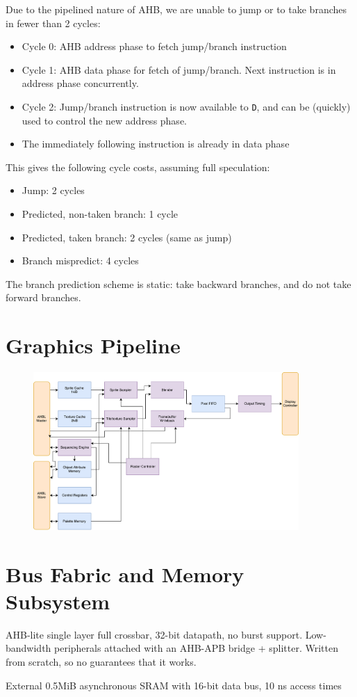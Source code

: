 \documentclass{article}
\begin{document}
Due to the pipelined nature of AHB, we are unable to jump or to take branches in fewer than 2 cycles:

\begin{itemize}
\item Cycle 0: AHB address phase to fetch jump/branch instruction
\item Cycle 1: AHB data phase for fetch of jump/branch. Next instruction is in address phase concurrently.
\item Cycle 2: Jump/branch instruction is now available to \texttt{D}, and can be (quickly) used to control the new address phase.
\item The immediately following instruction is already in data phase
\end{itemize}

This gives the following cycle costs, assuming full speculation:
\begin{itemize}
\item Jump: 2 cycles
\item Predicted, non-taken branch: 1 cycle
\item Predicted, taken branch: 2 cycles (same as jump)
\item Branch mispredict: 4 cycles
\end{itemize}

The branch prediction scheme is static: take backward branches, and do not take forward branches.

\section{Graphics Pipeline}

\begin{figure}[!htb]
\centering
\includegraphics[width=0.9\textwidth]{diagrams/graphics.pdf}
\end{figure}

\section{Bus Fabric and Memory Subsystem}

AHB-lite single layer full crossbar, 32-bit datapath, no burst support. Low-bandwidth peripherals attached with an AHB-APB bridge + splitter. Written from scratch, so no guarantees that it works.

External 0.5MiB asynchronous SRAM with 16-bit data bus, 10 ns access times
\end{document}
